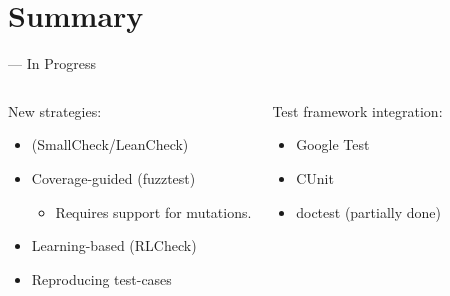 \section{Summary}

\begin{frame}{\halcheck{} --- In Progress}
  \begin{columns}[T,onlytextwidth]
    \begin{block}{New strategies:}
      \begin{itemize}
        \item {} (SmallCheck/LeanCheck)
        \item Coverage-guided (fuzztest)
              \begin{itemize}
                \item Requires support for \alert{mutations}.
              \end{itemize}
        \item Learning-based (RLCheck)
        \item Reproducing test-cases
      \end{itemize}
    \end{block}

    \begin{block}{Test framework integration:}
      \begin{itemize}
        \item Google Test
        \item CUnit
        \item doctest (partially done)
      \end{itemize}
    \end{block}
  \end{columns}
\end{frame}

